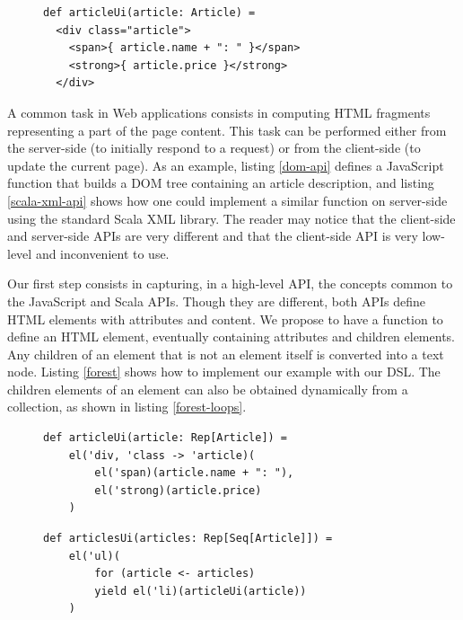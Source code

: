 \documentclass[preprint]{sigplanconf}
\begin{document}
\begin{figure}[htb]
\begin{lstlisting}[caption=Scala XML API,label=scala-xml-api]
def articleUi(article: Article) =
  <div class="article">
    <span>{ article.name + ": " }</span>
    <strong>{ article.price }</strong>
  </div>
\end{lstlisting}
\end{figure}

A common task in Web applications consists in computing HTML fragments representing a part of the
page content. This task can be performed either from the server-side (to initially respond to a
request) or from the client-side (to update the current page). As an example, listing \ref{dom-api}
defines a JavaScript function  that builds a DOM tree containing an article
description, and listing \ref{scala-xml-api} shows how one could implement a similar function on
server-side using the standard Scala XML library. The reader may notice that the client-side
and server-side APIs are very different and that the client-side API is very low-level and
inconvenient to use.

Our first step consists in capturing, in a high-level API, the concepts common to the JavaScript and
Scala APIs. Though they are different, both APIs define HTML elements with attributes and content.
We propose to have a function  to define an HTML element, eventually containing attributes
and children elements. Any children of an element that is not an element itself is converted into a
text node. Listing \ref{forest} shows how to implement our example with our DSL. The children
elements of an element can also be obtained dynamically from a collection, as shown in listing
\ref{forest-loops}.

\begin{figure}[htb]
\begin{lstlisting}[label=forest,caption=DOM definition DSL]
def articleUi(article: Rep[Article]) =
    el('div, 'class -> 'article)(
        el('span)(article.name + ": "),
        el('strong)(article.price)
    )
\end{lstlisting}
\end{figure}

\begin{figure}[htb]
\begin{lstlisting}[label=forest-loops,caption=Using loops]
def articlesUi(articles: Rep[Seq[Article]]) =
    el('ul)(
        for (article <- articles)
        yield el('li)(articleUi(article))
    )
\end{lstlisting}
\end{figure}
\end{document}
